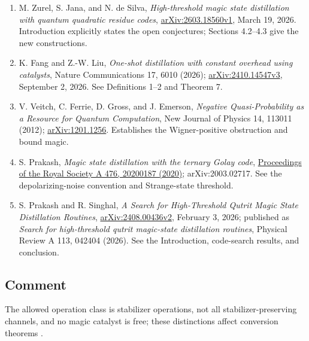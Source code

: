 \begin{enumerate}[label={},leftmargin=4.8em,labelsep=0.5em]
  \footnotesize
  \item[\textup{[Zurel26]}]\label{ref:6f1b-zurel26}
  M. Zurel, S. Jana, and N. de Silva, \emph{High-threshold magic state distillation with quantum quadratic residue codes}, \href{https://arxiv.org/html/2603.18560v1}{arXiv:2603.18560v1}, March 19, 2026. Introduction explicitly states the open conjectures; Sections 4.2–4.3 give the new constructions.

  \item[\textup{[Fang26]}]\label{ref:6f1b-fang26}
  K. Fang and Z.-W. Liu, \emph{One-shot distillation with constant overhead using catalysts}, Nature Communications 17, 6010 (2026); \href{https://arxiv.org/html/2410.14547v3}{arXiv:2410.14547v3}, September 2, 2026. See Definitions 1–2 and Theorem 7.

  \item[\textup{[Veitch12]}]\label{ref:6f1b-veitch12}
  V. Veitch, C. Ferrie, D. Gross, and J. Emerson, \emph{Negative Quasi-Probability as a Resource for Quantum Computation}, New Journal of Physics 14, 113011 (2012); \href{https://arxiv.org/abs/1201.1256}{arXiv:1201.1256}. Establishes the Wigner-positive obstruction and bound magic.

  \item[\textup{[Prakash20]}]\label{ref:6f1b-prakash20}
  S. Prakash, \emph{Magic state distillation with the ternary Golay code}, \href{https://doi.org/10.1098/rspa.2020.0187}{Proceedings of the Royal Society A 476, 20200187 (2020)}; arXiv:2003.02717. See the depolarizing-noise convention and Strange-state threshold.

  \item[\textup{[Prakash26]}]\label{ref:6f1b-prakash26}
  S. Prakash and R. Singhal, \emph{A Search for High-Threshold Qutrit Magic State Distillation Routines}, \href{https://arxiv.org/html/2408.00436v2}{arXiv:2408.00436v2}, February 3, 2026; published as \emph{Search for high-threshold qutrit magic-state distillation routines}, Physical Review A 113, 042404 (2026). See the Introduction, code-search results, and conclusion.
\end{enumerate}

\subsection*{Comment}

The allowed operation class is stabilizer operations, not all stabilizer-preserving channels, and no magic catalyst is free; these distinctions affect conversion theorems .


